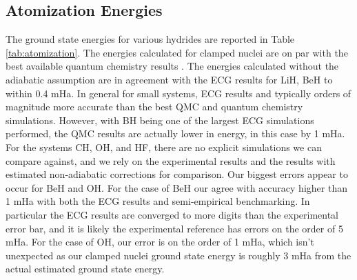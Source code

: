 \documentclass[pra,superscriptaddress,groupedaddress,twocolumn]{revtex4}
\begin{document}
\subsection{Atomization Energies}
The ground state energies for various hydrides are reported in Table \ref{tab:atomization}. The energies calculated for clamped nuclei are on par with the best available quantum chemistry results \cite{Adamowicz_LiH,Koput_BeH,Miliordos_BH}. The energies calculated without the adiabatic assumption are in agreement with the ECG results for LiH, BeH to within 0.4 mHa.   In general for small systems, ECG results and typically orders of magnitude more accurate than the best QMC and quantum chemistry simulations.  However, with BH being one of the largest ECG simulations performed, the QMC results are actually lower in energy, in this case by 1 mHa.  For the systems CH, OH, and HF, there are no explicit simulations we can compare against, and we rely on the experimental results and the results with estimated non-adiabatic corrections for comparison.  Our biggest errors appear to occur for BeH and OH.   For the case of BeH our agree with accuracy higher than 1 mHa with both the ECG results and semi-empirical benchmarking.  In particular the ECG results are converged to more digits than the experimental error bar, and it is likely the experimental reference has errors on the order of 5 mHa.   For the case of OH, our error is on the order of 1 mHa, which isn't unexpected as our clamped nuclei ground state energy is roughly 3 mHa from the actual estimated ground state energy.%
 
\end{document}
